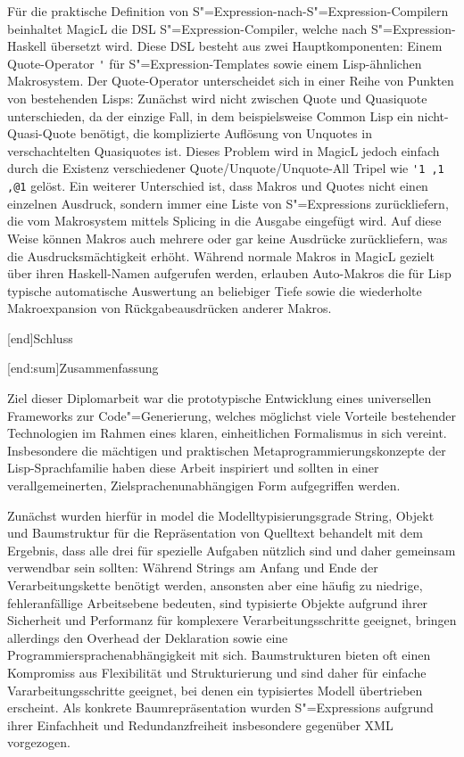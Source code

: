 \documentclass[11pt, a4paper, bibgerm]{scrbook}
\newcommand\icode[1]{\lstinline?#1?}
\newcommand\lchapter{}
\newcommand\lsection{}
\newcommand\cref{}
\newcommand{\sexp}{S"=Expression}
\newcommand{\sexps}{S"=Expressions}
\newcommand{\cgen}{Code"=Generierung}
\begin{document}
Für die praktische Definition von \sexp{}-nach-\sexp{}-Compilern
beinhaltet MagicL die DSL \sexp{}-Compiler, welche nach \sexp{}-Haskell
übersetzt wird. Diese DSL besteht aus zwei Hauptkomponenten: Einem
Quote-Operator \icode{'} für \sexp{}-Templates sowie einem
Lisp-ähnlichen Makrosystem. Der Quote-Operator unterscheidet sich in
einer Reihe von Punkten von bestehenden Lisps: Zunächst wird nicht
zwischen Quote und Quasiquote unterschieden, da der einzige Fall, in dem
beispielsweise Common Lisp ein nicht-Quasi-Quote benötigt, die
komplizierte Auflösung von Unquotes in verschachtelten Quasiquotes
ist. Dieses Problem wird in MagicL jedoch einfach durch die Existenz
verschiedener Quote/Unquote/Unquote-All Tripel wie \icode{'1 ,1 ,@1}
gelöst. Ein weiterer Unterschied ist, dass Makros und Quotes nicht einen
einzelnen Ausdruck, sondern immer eine Liste von \sexps{} zurückliefern,
die vom Makrosystem mittels Splicing in die Ausgabe eingefügt wird. Auf
diese Weise können Makros auch mehrere oder gar keine Ausdrücke
zurückliefern, was die Ausdrucksmächtigkeit erhöht. Während normale
Makros in MagicL gezielt über ihren Haskell-Namen aufgerufen werden,
erlauben Auto-Makros die für Lisp typische automatische Auswertung an
beliebiger Tiefe sowie die wiederholte Makroexpansion von
Rückgabeausdrücken anderer Makros.

\lchapter[end]{Schluss}

\lsection[end:sum]{Zusammenfassung}

Ziel dieser Diplomarbeit war die prototypische Entwicklung eines
universellen Frameworks zur \cgen{}, welches möglichst viele Vorteile
bestehender Technologien im Rahmen eines klaren, einheitlichen
Formalismus in sich vereint. Insbesondere die mächtigen und praktischen
Metaprogrammierungskonzepte der Lisp-Sprachfamilie haben diese Arbeit
inspiriert und sollten in einer verallgemeinerten,
Zielsprachenunabhängigen Form aufgegriffen werden.

Zunächst wurden hierfür in \cref{model} die Modelltypisierungsgrade
String, Objekt und Baumstruktur für die Repräsentation von Quelltext
behandelt mit dem Ergebnis, dass alle drei für spezielle Aufgaben
nützlich sind und daher gemeinsam verwendbar sein sollten: Während
Strings am Anfang und Ende der Verarbeitungskette benötigt werden,
ansonsten aber eine häufig zu niedrige, fehleranfällige Arbeitsebene
bedeuten, sind typisierte Objekte aufgrund ihrer Sicherheit und
Performanz für komplexere Verarbeitungsschritte geeignet, bringen
allerdings den Overhead der Deklaration sowie eine
Programmiersprachenabhängigkeit mit sich. Baumstrukturen bieten oft
einen Kompromiss aus Flexibilität und Strukturierung und sind daher für
einfache Vararbeitungsschritte geeignet, bei denen ein typisiertes
Modell übertrieben erscheint. Als konkrete Baumrepräsentation wurden
\sexps{} aufgrund ihrer Einfachheit und Redundanzfreiheit insbesondere
gegenüber XML vorgezogen.
\end{document}
